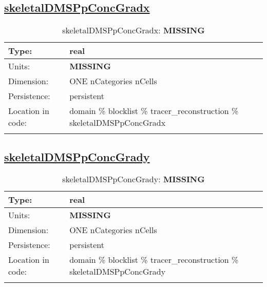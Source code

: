 \subsection[skeletalDMSPpConcGradx]{\hyperref[sec:var_tab_tracer_reconstruction]{skeletalDMSPpConcGradx}}
\label{subsec:var_sec_tracer_reconstruction_skeletalDMSPpConcGradx}
\begin{center}
\begin{longtable}{| p{2.0in} | p{4.0in} |}
        \hline 
        Type: & real \\
        \hline 
        Units: & {\bf \color{red} MISSING} \\
        \hline 
        Dimension: & ONE nCategories nCells \\
        \hline 
        Persistence: & persistent \\
        \hline 
         Location in code: & domain \% blocklist \% tracer\_reconstruction \% skeletalDMSPpConcGradx \\
         \hline 
    \caption{skeletalDMSPpConcGradx: {\bf \color{red} MISSING}}
\end{longtable}
\end{center}
\subsection[skeletalDMSPpConcGrady]{\hyperref[sec:var_tab_tracer_reconstruction]{skeletalDMSPpConcGrady}}
\label{subsec:var_sec_tracer_reconstruction_skeletalDMSPpConcGrady}
\begin{center}
\begin{longtable}{| p{2.0in} | p{4.0in} |}
        \hline 
        Type: & real \\
        \hline 
        Units: & {\bf \color{red} MISSING} \\
        \hline 
        Dimension: & ONE nCategories nCells \\
        \hline 
        Persistence: & persistent \\
        \hline 
         Location in code: & domain \% blocklist \% tracer\_reconstruction \% skeletalDMSPpConcGrady \\
         \hline 
    \caption{skeletalDMSPpConcGrady: {\bf \color{red} MISSING}}
\end{longtable}
\end{center}
